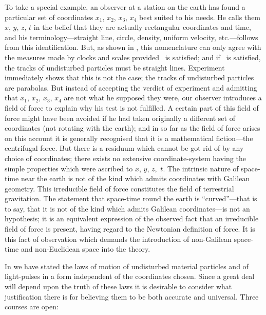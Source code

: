 \documentclass[12pt]{book}
\begin{document}
To take a special example, an observer at a station on the earth has found
a particular set of coordinates $x_{1}$, $x_{2}$, $x_{3}$, $x_{4}$ best suited to his needs. He calls
them $x$, $y$, $z$, $t$ in the belief that they are actually rectangular coordinates and
time, and his terminology---straight line, circle, density, uniform velocity, etc.---follows
from this identification. But, as shown in , this nomenclature can
only agree with the measures made by clocks and scales provided ~is
satisfied; and if ~is satisfied, the tracks of undisturbed particles must be
straight lines. Experiment immediately shows that this is not the case; the
tracks of undisturbed particles are parabolas. But instead of accepting the
verdict of experiment and admitting that $x_{1}$, $x_{2}$, $x_{3}$, $x_{4}$ are not what he supposed
they were, our observer introduces a field of force to explain why his
test is not fulfilled. A certain part of this field of force might have been
avoided if he had taken originally a different set of coordinates (not rotating
with the earth); and in so far as the field of force arises on this account it is
generally recognised that it is a mathematical fiction---the centrifugal force.
But there is a residuum which cannot be got rid of by any choice of coordinates;
there exists no extensive coordinate-system having the simple
properties which were ascribed to $x$, $y$, $z$,~$t$. The intrinsic nature of space-time
near the earth is not of the kind which admits coordinates with Galilean
geometry. This irreducible field of force constitutes the field of terrestrial
gravitation. The statement that space-time round the earth is ``curved''---that
is to say, that it is not of the kind which admits Galilean coordinates---is
not an hypothesis; it is an equivalent expression of the observed fact that
an irreducible field of force is present, having regard to the Newtonian
definition of force. It is this fact of observation which demands the introduction
of non-Galilean space-time and non-Euclidean space into the theory.


In  we have stated the laws of motion of undisturbed material particles
and of light-pulses in a form independent of the coordinates chosen. Since
a great deal will depend upon the truth of these laws it is desirable to
consider what justification there is for believing them to be both accurate
and universal. Three courses are open:
\end{document}
